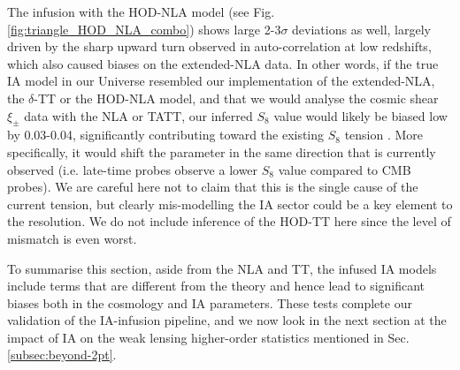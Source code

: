 The infusion with the HOD-NLA model (see Fig. \ref{fig:triangle_HOD_NLA_combo}) shows large 2-3$\sigma$ deviations as well, largely driven by the sharp upward turn observed in auto-correlation at low redshifts, which also caused biases on the extended-NLA data. In other words, if the true IA model in our Universe resembled our implementation of the extended-NLA, the $\delta$-TT or the HOD-NLA model, and that we would analyse the cosmic shear $\xi_\pm$ data with the NLA or TATT, our inferred $S_8$ value would likely be biased low by 0.03-0.04, significantly contributing toward the existing $S_8$ tension \citep[see, e.g.][]{KV450, QUAIA_Alonso2023}. More specifically, it would shift the parameter in the same direction that is currently observed (i.e. late-time probes observe a lower $S_8$ value compared to CMB probes). We are careful here not to claim that this is the single cause of the current tension, but clearly mis-modelling the IA sector could be a key element to the resolution. We do not include inference of the HOD-TT here since the level of mismatch is even worst.
  
 To summarise this section, aside from the NLA and TT, the infused IA models include terms that are different from the theory and hence lead to significant biases both in the cosmology and IA parameters.  
 These tests complete our validation of the IA-infusion pipeline, and we now look in the next section at the impact of IA on the weak lensing higher-order statistics mentioned in Sec. \ref{subsec:beyond-2pt}.
 